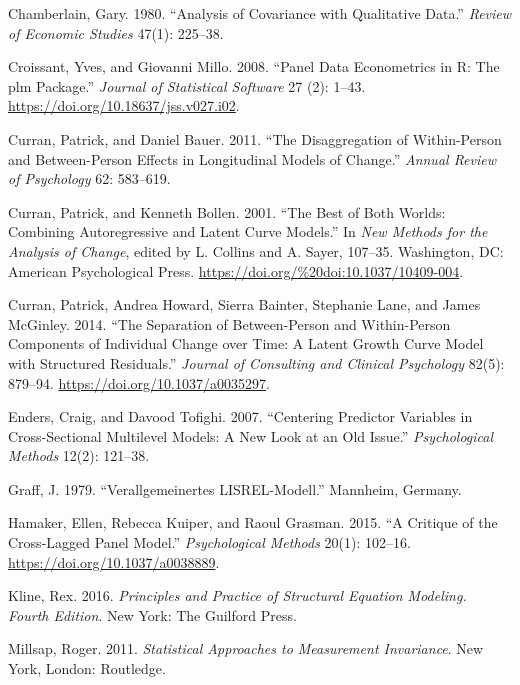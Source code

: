 \documentclass[
  12pt,
  a4paper]{article}
\begin{document}
\leavevmode\hypertarget{ref-Chamberlain1980}{}%
Chamberlain, Gary. 1980. ``Analysis of Covariance with Qualitative
Data.'' \emph{Review of Economic Studies} 47(1): 225--38.

\leavevmode\hypertarget{ref-R-plm_a}{}%
Croissant, Yves, and Giovanni Millo. 2008. ``Panel Data Econometrics in
R: The plm Package.'' \emph{Journal of Statistical Software} 27 (2):
1--43. \url{https://doi.org/10.18637/jss.v027.i02}.

\leavevmode\hypertarget{ref-Curran2011}{}%
Curran, Patrick, and Daniel Bauer. 2011. ``The Disaggregation of
Within-Person and Between-Person Effects in Longitudinal Models of
Change.'' \emph{Annual Review of Psychology} 62: 583--619.

\leavevmode\hypertarget{ref-Curran2001}{}%
Curran, Patrick, and Kenneth Bollen. 2001. ``The Best of Both Worlds:
Combining Autoregressive and Latent Curve Models.'' In \emph{New Methods
for the Analysis of Change}, edited by L. Collins and A. Sayer, 107--35.
Washington, DC: American Psychological Press.
\url{https://doi.org/\%20doi:10.1037/10409-004}.

\leavevmode\hypertarget{ref-Curran2014}{}%
Curran, Patrick, Andrea Howard, Sierra Bainter, Stephanie Lane, and
James McGinley. 2014. ``The Separation of Between-Person and
Within-Person Components of Individual Change over Time: A Latent Growth
Curve Model with Structured Residuals.'' \emph{Journal of Consulting and
Clinical Psychology} 82(5): 879--94.
\url{https://doi.org/10.1037/a0035297}.

\leavevmode\hypertarget{ref-Enders2007}{}%
Enders, Craig, and Davood Tofighi. 2007. ``Centering Predictor Variables
in Cross-Sectional Multilevel Models: A New Look at an Old Issue.''
\emph{Psychological Methods} 12(2): 121--38.

\leavevmode\hypertarget{ref-Graff1979}{}%
Graff, J. 1979. ``Verallgemeinertes LISREL-Modell.'' Mannheim, Germany.

\leavevmode\hypertarget{ref-Hamaker2015}{}%
Hamaker, Ellen, Rebecca Kuiper, and Raoul Grasman. 2015. ``A Critique of
the Cross-Lagged Panel Model.'' \emph{Psychological Methods} 20(1):
102--16. \url{https://doi.org/10.1037/a0038889}.

\leavevmode\hypertarget{ref-Kline2016}{}%
Kline, Rex. 2016. \emph{Principles and Practice of Structural Equation
Modeling. Fourth Edition}. New York: The Guilford Press.

\leavevmode\hypertarget{ref-Millsap2011}{}%
Millsap, Roger. 2011. \emph{Statistical Approaches to Measurement
Invariance}. New York, London: Routledge.
\end{document}
